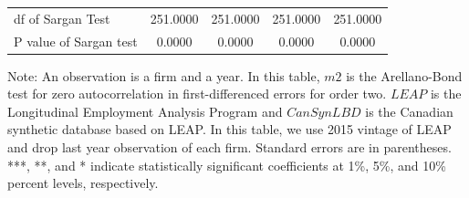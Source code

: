 \documentclass[10pt,twoside]{article}
\begin{document}
\begin{table}[H]
\begin{threeparttable}
\begin{tabular}{l|c c| c c}
df of Sargan Test& 251.0000         & 251.0000         & 251.0000         & 251.0000         \\
P value of Sargan test&   0.0000         &   0.0000         &   0.0000         &   0.0000         \\
    \bottomrule
  \end{tabular} 
\begin{tablenotes}
\small
\item Note: An observation is a firm and a year. In this table, $m2$ is the Arellano-Bond test for zero autocorrelation in first-differenced errors for order two. $LEAP$ is the Longitudinal Employment Analysis Program and $CanSynLBD$ is the Canadian synthetic database based on LEAP. In this table, we use 2015 vintage of LEAP and drop last year observation of each firm. Standard errors are in parentheses. ***, **, and * indicate statistically significant coefficients at 1\%, 5\%, and 10\% percent levels, respectively.
 \end{tablenotes}
 \end{threeparttable}
\end{table}
\end{document}
